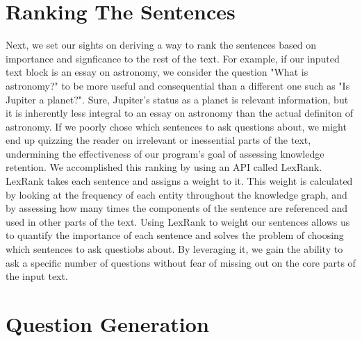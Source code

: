 \documentclass[finalcopy]{srpaper}
\begin{document}
%
%
\chapter{Ranking The Sentences}
\label{Chapter:Sentence Ranking}

Next, we set our sights on deriving a way to rank the sentences based on importance and signficance to the rest of the text. For example, if our inputed text block is an essay on astronomy, we consider the question "What is astronomy?" to be more useful and consequential than a different one such as "Is Jupiter a planet?". Sure, Jupiter's status as a planet is relevant information, but it is inherently less integral to an essay on astronomy than the actual definiton of astronomy. If we poorly chose which sentences to ask questions about, we might end up quizzing the reader on irrelevant or inessential parts of the text, undermining the effectiveness of our program's goal of assessing knowledge retention.
\newline
We accomplished this ranking by using an API called LexRank. LexRank takes each sentence and assigns a weight to it. This weight is calculated by looking at the frequency of each entity throughout the knowledge graph, and by assessing how many times the components of the sentence are referenced and used in other parts of the text.
\newline
Using LexRank to weight our sentences allows us to quantify the importance of each sentence and solves the problem of choosing which sentences to ask questiobs about. By leveraging it, we gain the ability to ask a specific number of questions without fear of missing out on the core parts of the input text. 


%
%
\chapter{Question Generation}
\label{Chapter:Question Generation}
\end{document}
